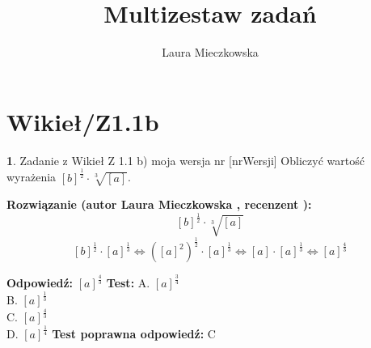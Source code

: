 \documentclass[12pt, a4paper]{article}
\title{Multizestaw zadań}
\author{Laura Mieczkowska}
\date{}
\theoremstyle{definition} %
\newtheorem{zad}{}
\newcommand{\kategoria}[1]{\section{#1}} %
\newcommand{\zadStart}[1]{\begin{zad}#1\newline} %
\newcommand{\zadStop}{\end{zad}}   %
\newcommand{\rozwStart}[2]{\noindent \textbf{Rozwiązanie (autor #1 , recenzent #2): }\newline} %
\newcommand{\odpStart}{\noindent \textbf{Odpowiedź:}\newline}    %
\newcommand{\odpStop}{\newline}                                             %
\newcommand{\testStart}{\noindent \textbf{Test:}\newline} %
\newcommand{\testStop}{\newline} %
\newcommand{\kluczStart}{\noindent \textbf{Test poprawna odpowiedź:}\newline} %
\newcommand{\kluczStop}{\newline} %
\begin{document}
\maketitle


\kategoria{Wikieł/Z1.1b}
\zadStart{Zadanie z Wikieł Z 1.1 b) moja wersja nr [nrWersji]}
Obliczyć wartość wyrażenia $[b]^{\frac{1}{2}}\cdot\sqrt[3]{[a]}$.
\zadStop
\rozwStart{Laura Mieczkowska}{}
$$[b]^{\frac{1}{2}}\cdot\sqrt[3]{[a]}$$ 
$$[b]^{\frac{1}{2}}\cdot[a]^{\frac{1}{3}} \Leftrightarrow ([a]^2)^{\frac{1}{2}}\cdot[a]^{\frac{1}{3}} \Leftrightarrow [a]\cdot[a]^{\frac{1}{3}} \Leftrightarrow [a]^{\frac{4}{3}}$$



\odpStart
$[a]^{\frac{4}{3}}$
\odpStop
\testStart
A. $[a]^{\frac{3}{4}}$ \\
B. $[a]^{\frac{1}{3}}$ \\
C. $[a]^{\frac{4}{3}}$ \\
D. $[a]^{\frac{1}{4}}$ 
\testStop
\kluczStart
C
\kluczStop
\end{document}
